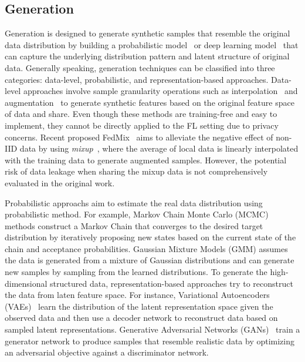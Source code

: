 

\subsection{Generation}
\label{sec:generation}
Generation is designed to generate synthetic samples that resemble the original data distribution by building a probabilistic model~\cite{geyer1992practical} or deep learning model~\cite{kingma2014auto, goodfellow2020generative, cao2022survey} that can capture the underlying distribution pattern and latent structure of original data.
Generally speaking, generation techniques can be classified into three categories: data-level, probabilistic, and representation-based approaches.
Data-level approaches involve sample granularity operations such as interpolation~\cite{chawla2002smote, zhangmixup} and augmentation~\cite{wong2016understanding} to generate synthetic features based on the original feature space of data and share.
Even though these methods are training-free and easy to implement, they cannot be directly applied to the FL setting due to privacy concerns.
Recent proposed FedMix~\cite{yoon2021fedmix} aims to alleviate the negative effect of non-IID data by using \textit{mixup}~\cite{zhangmixup}, where the average of local data is linearly interpolated with the training data to generate augmented samples.
However, the potential risk of data leakage when sharing the mixup data is not comprehensively evaluated in the original work.

Probabilistic approachs aim to estimate the real data distribution using probabilistic method.
For example, Markov Chain Monte Carlo (MCMC)~\cite{geyer1992practical} methods construct a Markov Chain that converges to the desired target distribution by iteratively proposing new states based on the current state of the chain and acceptance probabilities.
Gaussian Mixture Models (GMM) assumes the data is generated from a mixture of Gaussian distributions and can generate new samples by sampling from the learned distributions.
To generate the high-dimensional structured data, representation-based approaches try to reconstruct the data from laten feature space.
For instance, Variational Autoencoders (VAEs)~\cite{kingma2014auto} learn the distribution of the latent representation space given the observed data and then use a decoder network to reconstruct data based on sampled latent representations.
Generative Adversarial Networks (GANs)~\cite{goodfellow2020generative} train a generator network to produce samples that resemble realistic data by optimizing an adversarial objective against a discriminator network.

